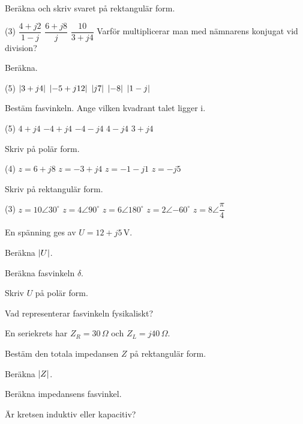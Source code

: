 Beräkna och skriv svaret på rektangulär form.
\begin{delar}(3)
  \task $\dfrac{4 + j2}{1 - j}$
  \task $\dfrac{6 + j8}{j}$
  \task $\dfrac{10}{3 + j4}$
  \task* Varför multiplicerar man med nämnarens konjugat vid division?
\end{delar}

Beräkna.
\begin{delar}(5)
  \task $\lvert3 + j4\rvert$
  \task $\lvert-5 + j12\rvert$
  \task $\lvert j7\rvert$
  \task $\lvert-8\rvert$
  \task $\lvert1 - j\rvert$
\end{delar}

Bestäm fasvinkeln. Ange vilken kvadrant talet ligger i.
\begin{delar}(5)
  \task $4 + j4$
  \task $-4 + j4$
  \task $-4 - j4$
  \task $4 - j4$
  \task $3 + j4$
\end{delar}

Skriv på polär form.
\begin{delar}(4)
  \task $z = 6 + j8$
  \task $z = -3 + j4$
  \task $z = -1 - j1$
  \task $z = -j5$
\end{delar}

Skriv på rektangulär form.
\begin{delar}(3)
  \task $z = 10\angle 30^{\circ}$
  \task $z = 4\angle 90^{\circ}$
  \task $z = 6\angle 180^{\circ}$
  \task $z = 2\angle{-60^{\circ}}$
  \task $z = 8\angle\dfrac{\pi}{4}$
\end{delar}

En spänning ges av $U = 12 + j5\,\text{V}$.
\begin{parts}
  \item Beräkna $\lvert U\rvert$.
  \item Beräkna fasvinkeln $\delta$.
  \item Skriv $U$ på polär form.
  \item Vad representerar fasvinkeln fysikaliskt?
\end{parts}

En seriekrets har $Z_R = 30\,\Omega$ och $Z_L = j40\,\Omega$.
\begin{parts}
  \item Bestäm den totala impedansen $Z$ på rektangulär form.
  \item Beräkna $\lvert Z\rvert$.
  \item Beräkna impedansens fasvinkel.
  \item Är kretsen induktiv eller kapacitiv?
\end{parts}

